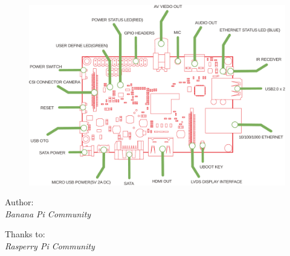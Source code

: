 \documentclass[letterpaper,twoside,openleft]{blocksbook}
\begin{document}
\thispagestyle{empty}
\newcommand{\version}{1.0}

\begin{center}
\\
\vspace{0.1cm}
{}
\end{center}
\vspace*{0.2cm}
\begin{figure}[h!]
\begin{center}
    \includegraphics[scale=0.4]{fig/bpi-top.pdf}
\end{center}
\end{figure}
\vspace*{0.02\stockheight}
\begin{minipage}{0.4\textwidth}
\begin{flushleft} \large
\hspace*{0.2cm}Author:\\
\hspace*{0.2cm}\emph{Banana Pi Community}\\
\vfill
\end{flushleft}
\end{minipage}
\hspace{5mm}
\begin{minipage}{0.6\textwidth}
\begin{flushright} \large
Thanks to:\\
\emph{Rasperry Pi Community}\\
\vfill
\end{flushright}
\end{minipage}
\vspace*{0.5cm}
\vfill
\begin{center}
    \hspace*{1cm}\\[2.5ex]
    \hspace*{1cm}{\tiny\CcNote{\CcLongnameByNcSa}}
\end{center}
\end{document}
